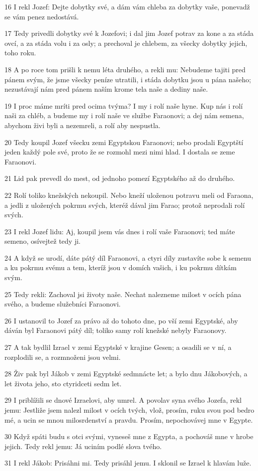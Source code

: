\par 16 I rekl Jozef: Dejte dobytky své, a dám vám chleba za dobytky vaše, ponevadž se vám penez nedostává.
\par 17 Tedy privedli dobytky své k Jozefovi; i dal jim Jozef potrav za kone a za stáda ovcí, a za stáda volu i za osly; a prechoval je chlebem, za všecky dobytky jejich, toho roku.
\par 18 A po roce tom prišli k nemu léta druhého, a rekli mu: Nebudeme tajiti pred pánem svým, že jsme všecky peníze utratili, i stáda dobytku jsou u pána našeho; nezustávají nám pred pánem naším krome tela naše a dediny naše.
\par 19 I proc máme mríti pred ocima tvýma? I my i rolí naše hyne. Kup nás i rolí naši za chléb, a budeme my i rolí naše ve službe Faraonovi; a dej nám semena, abychom živi byli a nezemreli, a rolí aby nespustla.
\par 20 Tedy koupil Jozef všecku zemi Egyptskou Faraonovi; nebo prodali Egyptští jeden každý pole své, proto že se rozmohl mezi nimi hlad. I dostala se zeme Faraonovi.
\par 21 Lid pak prevedl do mest, od jednoho pomezí Egyptského až do druhého.
\par 22 Rolí toliko knežských nekoupil. Nebo kneží uloženou potravu meli od Faraona, a jedli z uložených pokrmu svých, kteréž dával jim Farao; protož neprodali rolí svých.
\par 23 I rekl Jozef lidu: Aj, koupil jsem vás dnes i rolí vaše Faraonovi; ted máte semeno, osívejtež tedy ji.
\par 24 A když se urodí, dáte pátý díl Faraonovi, a ctyri díly zustavíte sobe k semenu a ku pokrmu svému a tem, kteríž jsou v domích vašich, i ku pokrmu dítkám svým.
\par 25 Tedy rekli: Zachoval jsi životy naše. Nechat nalezneme milost v ocích pána svého, a budeme služebníci Faraonovi.
\par 26 I ustanovil to Jozef za právo až do tohoto dne, po vší zemi Egyptské, aby dáván byl Faraonovi pátý díl; toliko samy rolí knežské nebyly Faraonovy.
\par 27 A tak bydlil Izrael v zemi Egyptské v krajine Gesen; a osadili se v ní, a rozplodili se, a rozmnoženi jsou velmi.
\par 28 Živ pak byl Jákob v zemi Egyptské sedmnácte let; a bylo dnu Jákobových, a let života jeho, sto ctyridceti sedm let.
\par 29 I priblížili se dnové Izraelovi, aby umrel. A povolav syna svého Jozefa, rekl jemu: Jestliže jsem nalezl milost v ocích tvých, vlož, prosím, ruku svou pod bedro mé, a ucin se mnou milosrdenství a pravdu. Prosím, nepochovávej mne v Egypte.
\par 30 Když spáti budu s otci svými, vyneseš mne z Egypta, a pochováš mne v hrobe jejich. Tedy rekl jemu: Já uciním podlé slova tvého.
\par 31 I rekl Jákob: Prisáhni mi. Tedy prisáhl jemu. I sklonil se Izrael k hlavám luže.

